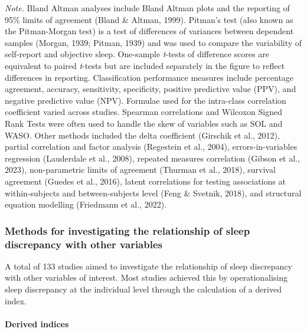 \documentclass[
]{article}
\begin{document}
\emph{Note.} Bland Altman analyses include Bland Altman plots and the reporting of 95\% limits of agreement (Bland \& Altman, 1999). Pitman's test (also known as the Pitman-Morgan test) is a test of differences of variances between dependent samples (Morgan, 1939; Pitman, 1939) and was used to compare the variability of self-report and objective sleep.
One-sample \emph{t}-tests of difference scores are equivalent to paired \emph{t}-tests but are included separately in the figure to reflect differences in reporting. Classification performance measures include percentage agreement, accuracy, sensitivity, specificity, positive predictive value (PPV), and negative predictive value (NPV). Formulae used for the intra-class correlation coefficient varied across studies. Spearman correlations and Wilcoxon Signed Rank Tests were often used to handle the skew of variables such as SOL and WASO. Other methods included the delta coefficient (Girschik et al., 2012), partial correlation and factor analysis (Regestein et al., 2004), errors-in-variables regression (Lauderdale et al., 2008), repeated measures correlation (Gibson et al., 2023), non-parametric limits of agreement (Thurman et al., 2018), survival agreement (Guedes et al., 2016), latent correlations for testing associations at within-subjects and between-subjects level (Feng \& Svetnik, 2018), and structural equation modelling (Friedmann et al., 2022).

\subsubsection{Methods for investigating the relationship of sleep discrepancy with other variables}\label{methods-for-investigating-the-relationship-of-sleep-discrepancy-with-other-variables}

A total of 133 studies aimed to investigate the relationship of sleep discrepancy with other variables of interest. Most studies achieved this by operationalising sleep discrepancy at the individual level through the calculation of a derived index.

\paragraph{Derived indices}\label{derived-indices}
\end{document}
